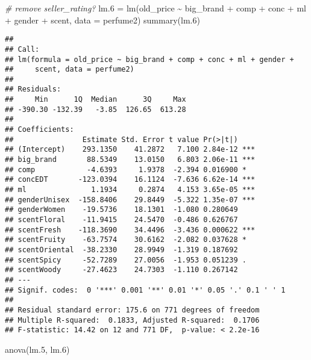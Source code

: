 \documentclass[
]{article}
\newenvironment{Shaded}{\begin{snugshade}}{\end{snugshade}}
\newcommand{\AttributeTok}[1]{\textcolor[rgb]{0.77,0.63,0.00}{#1}}
\newcommand{\CommentTok}[1]{\textcolor[rgb]{0.56,0.35,0.01}{\textit{#1}}}
\newcommand{\FloatTok}[1]{\textcolor[rgb]{0.00,0.00,0.81}{#1}}
\newcommand{\FunctionTok}[1]{\textcolor[rgb]{0.00,0.00,0.00}{#1}}
\newcommand{\NormalTok}[1]{#1}
\newcommand{\OtherTok}[1]{\textcolor[rgb]{0.56,0.35,0.01}{#1}}
\newcommand{\SpecialCharTok}[1]{\textcolor[rgb]{0.00,0.00,0.00}{#1}}
\begin{document}
\begin{Shaded}
\begin{Highlighting}[]
\CommentTok{\# remove seller\_rating?}
\NormalTok{lm}\FloatTok{.6} \OtherTok{=} \FunctionTok{lm}\NormalTok{(old\_price }\SpecialCharTok{\textasciitilde{}}\NormalTok{ big\_brand }\SpecialCharTok{+}\NormalTok{ comp }\SpecialCharTok{+} 
\NormalTok{            conc }\SpecialCharTok{+}\NormalTok{ ml }\SpecialCharTok{+} 
\NormalTok{            gender }\SpecialCharTok{+}\NormalTok{ scent, }\AttributeTok{data =}\NormalTok{ perfume2)}
\FunctionTok{summary}\NormalTok{(lm}\FloatTok{.6}\NormalTok{)}
\end{Highlighting}
\end{Shaded}

\begin{verbatim}
## 
## Call:
## lm(formula = old_price ~ big_brand + comp + conc + ml + gender + 
##     scent, data = perfume2)
## 
## Residuals:
##     Min      1Q  Median      3Q     Max 
## -390.30 -132.39   -3.85  126.65  613.28 
## 
## Coefficients:
##                Estimate Std. Error t value Pr(>|t|)    
## (Intercept)    293.1350    41.2872   7.100 2.84e-12 ***
## big_brand       88.5349    13.0150   6.803 2.06e-11 ***
## comp            -4.6393     1.9378  -2.394 0.016900 *  
## concEDT       -123.0394    16.1124  -7.636 6.62e-14 ***
## ml               1.1934     0.2874   4.153 3.65e-05 ***
## genderUnisex  -158.8406    29.8449  -5.322 1.35e-07 ***
## genderWomen    -19.5736    18.1301  -1.080 0.280649    
## scentFloral    -11.9415    24.5470  -0.486 0.626767    
## scentFresh    -118.3690    34.4496  -3.436 0.000622 ***
## scentFruity    -63.7574    30.6162  -2.082 0.037628 *  
## scentOriental  -38.2330    28.9949  -1.319 0.187692    
## scentSpicy     -52.7289    27.0056  -1.953 0.051239 .  
## scentWoody     -27.4623    24.7303  -1.110 0.267142    
## ---
## Signif. codes:  0 '***' 0.001 '**' 0.01 '*' 0.05 '.' 0.1 ' ' 1
## 
## Residual standard error: 175.6 on 771 degrees of freedom
## Multiple R-squared:  0.1833, Adjusted R-squared:  0.1706 
## F-statistic: 14.42 on 12 and 771 DF,  p-value: < 2.2e-16
\end{verbatim}

\begin{Shaded}
\begin{Highlighting}[]
\FunctionTok{anova}\NormalTok{(lm}\FloatTok{.5}\NormalTok{, lm}\FloatTok{.6}\NormalTok{)}
\end{Highlighting}
\end{Shaded}
\end{document}
